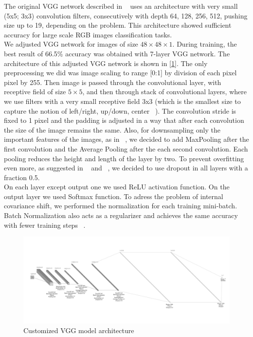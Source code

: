 The original VGG network described in ~\cite{VGG} uses an architecture with very small (5x5; 3x3) convolution filters, consecutively with depth 64, 128, 256, 512, pushing size up to 19, depending on the problem. This architecture showed sufficient accuracy for large scale RGB images classification tasks.\\

We adjusted VGG network for images of size $48\times48\times1$. During training, the best result of 66.5\% accuracy was obtained with 7-layer VGG network. The architecture of this adjusted VGG network is shown in [\ref{fig:VGG}]. The only preprocessing we did was image scaling to range [0:1] by division of each pixel pixel by 255. Then image is passed through the convolutional layer, with receptive field of size $5\times5$, and then through  stack of convolutional layers, where we use filters with a very small receptive field 3x3 (which is the smallest size to capture the notion of left/right, up/down, center ~\cite{VGG}). The convolution stride is fixed to 1 pixel and the padding is adjusted in a way that after each convolution the size of the image remains the same. Also, for downsampling only the important features of the images, as in ~\cite{MaxOut}, we decided to add MaxPooling after the first convolution and the Average Pooling after the each second convolution. Each pooling reduces the height and length of the layer by two. To prevent overfitting even more, as suggested in ~\cite{DropOut} and ~\cite{DropOutOverfit}, we decided to use dropout in all layers with a fraction 0.5.\\

On each layer except output one we used ReLU activation function.  On the output layer we used Softmax function. To adress the problem of internal covariance shift, we performed the normalization for each training mini-batch. Batch Normalization also acts as a regularizer and achieves the same accuracy with fewer training steps ~\cite{batchnormalization}.

\begin{figure}
	\centering
	\includegraphics[width=\textwidth]{../images/vgg-adjusted.jpg}
	\caption{Customized VGG model architecture}
	\label{fig:VGG}
\end{figure}

